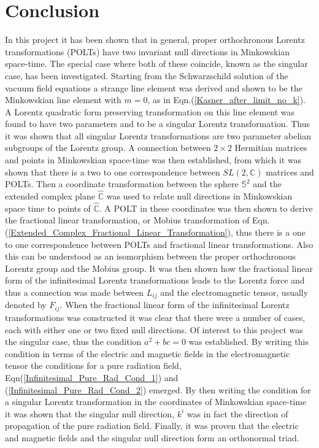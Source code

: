 \section{Conclusion}

In this project it has been shown that in general, proper orthochronous Lorentz transformations (POLTs) have two invariant null directions in Minkowskian space-time. The special case where both of these coincide, known as the singular case, has been investigated. Starting from the Schwarzschild solution of the vacuum field equations a strange line element was derived and shown to be the Minkowskian line element with $m = 0$, as in Eqn.(\ref{Kasner_after_limit_no_k}). A Lorentz quadratic form preserving transformation on this line element was found to have two parameters and to be a singular Lorentz transformation. Thus it was shown that all singular Lorentz transformations are two parameter abelian subgroups of the Lorentz group. A connection between $2 \times 2$ Hermitian matrices and points in Minkowskian space-time was then established, from which it was shown that there is a two to one correspondence between $SL(2,\mathbb{C})$ matrices and POLTs. Then a coordinate transformation between the sphere $\mathbb{S}^2$ and the extended complex plane $\hat{\mathbb{C}}$ was used to relate null directions in Minkowskian space time to points of $\hat{\mathbb{C}}$. A POLT in these coordinates was then shown to derive the fractional linear transformation, or Mobius transformation of Eqn.(\ref{Extended_Complex_Fractional_Linear_Transformation}), thus there is a one to one correspondence between POLTs and fractional linear transformations. Also this can be understood as an isomorphism between the proper orthochronous Lorentz group and the Mobius group. It was then shown how the fractional linear form of the infinitesimal Lorentz transformations leads to the Lorentz force and thus a connection was made between $L_{ij}$ and the electromagnetic tensor, usually denoted by $F_{ij}$. When the fractional linear form of the infinitesimal Lorentz transformations was constructed it was clear that there were a number of cases, each with either one or two fixed null directions. Of interest to this project was the singular case, thus the condition $a^2 + bc = 0$ was established. By writing this condition in terms of the electric and magnetic fields in the electromagnetic tensor the conditions for a pure radiation field, Eqn(\ref{Infinitesimal_Pure_Rad_Cond_1}) and (\ref{Infinitesimal_Pure_Rad_Cond_2}) emerged. By then writing the condition for a singular Lorentz transformation in the coordinates of Minkowskian space-time it was shown that the singular null direction, $k^i$ was in fact the direction of propagation of the pure radiation field. Finally, it was proven that the electric and magnetic fields and the singular null direction form an orthonormal triad.     
